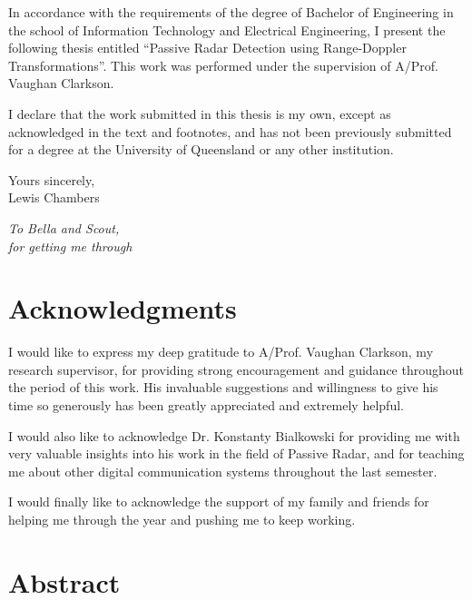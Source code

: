 \documentclass[12pt,openany,a4paper]{book}
\renewcommand{\baselinestretch}{1.2}	%
\begin{document}
In accordance with the requirements of the degree of Bachelor of
Engineering in the school of Information Technology and
Electrical Engineering, I present the
following thesis entitled ``Passive Radar Detection using Range-Doppler Transformations''.  This work was performed 
under the supervision of A/Prof. Vaughan Clarkson.

I declare that the work submitted in this thesis is my own, except as
acknowledged in the text and footnotes, and has not been previously
submitted for a degree at the University of Queensland or any other
institution.

\begin{flushright}
	Yours sincerely,\\
	\bigskip\bigskip
	\medskip
	Lewis Chambers
\end{flushright}

\cleardoublepage

\vspace*{70mm}
\begin{center}
\renewcommand{\baselinestretch}{1.0}
\sl
	To Bella and Scout, \\
	for getting me through
\end{center}

\chapter{Acknowledgments}

I would like to express my deep gratitude to A/Prof. Vaughan Clarkson, my research supervisor,
for providing strong encouragement and guidance throughout the period of this work. His invaluable
suggestions and willingness to give his time so generously has been greatly appreciated and extremely helpful.

\bigskip

I would also like to acknowledge Dr. Konstanty Bialkowski for providing me with very valuable insights
into his work in the field of Passive Radar, and for teaching me about other digital communication 
systems throughout the last semester.

\bigskip

I would finally like to acknowledge the support of my family and friends for helping me through the year and pushing me to keep working.

\cleardoublepage

\chapter{Abstract}
\end{document}

